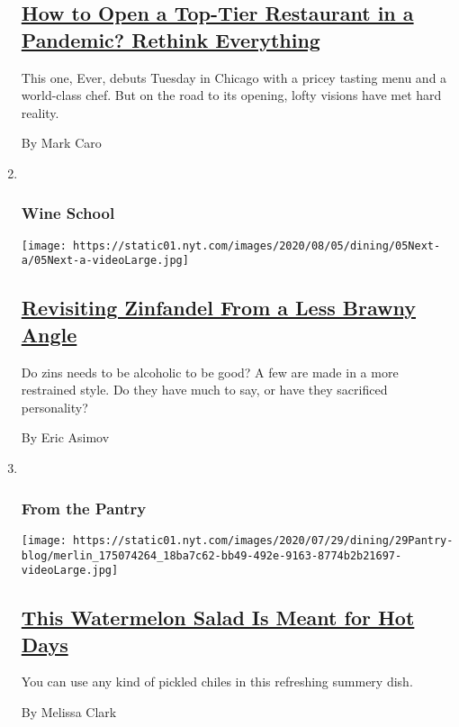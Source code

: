 \begin{enumerate}
  \hypertarget{how-to-open-a-top-tier-restaurant-in-a-pandemic-rethink-everything}{%
  \subsection{\texorpdfstring{\href{/2020/07/28/dining/ever-chicago-restaurant-coronavirus.html}{How
  to Open a Top-Tier Restaurant in a Pandemic? Rethink
  Everything}}{How to Open a Top-Tier Restaurant in a Pandemic? Rethink Everything}}\label{how-to-open-a-top-tier-restaurant-in-a-pandemic-rethink-everything}}

  This one, Ever, debuts Tuesday in Chicago with a pricey tasting menu
  and a world-class chef. But on the road to its opening, lofty visions
  have met hard reality.

  By Mark Caro
\item ~
  \hypertarget{wine-school-1}{%
  \subsubsection{Wine School}\label{wine-school-1}}

  \texttt{[image: https://static01.nyt.com/images/2020/08/05/dining/05Next-a/05Next-a-videoLarge.jpg]}

  \hypertarget{revisiting-zinfandel-from-a-less-brawny-angle}{%
  \subsection{\texorpdfstring{\href{/2020/07/30/dining/drinks/wine-school-assignment-zinfandel.html}{Revisiting
  Zinfandel From a Less Brawny
  Angle}}{Revisiting Zinfandel From a Less Brawny Angle}}\label{revisiting-zinfandel-from-a-less-brawny-angle}}

  Do zins needs to be alcoholic to be good? A few are made in a more
  restrained style. Do they have much to say, or have they sacrificed
  personality?

  By Eric Asimov
\item ~
  \hypertarget{from-the-pantry}{%
  \subsubsection{From the Pantry}\label{from-the-pantry}}

  \texttt{[image: https://static01.nyt.com/images/2020/07/29/dining/29Pantry-blog/merlin\_175074264\_18ba7c62-bb49-492e-9163-8774b2b21697-videoLarge.jpg]}

  \hypertarget{this-watermelon-salad-is-meant-for-hot-days}{%
  \subsection{\texorpdfstring{\href{/2020/07/29/dining/watermelon-salad-recipe.html}{This
  Watermelon Salad Is Meant for Hot
  Days}}{This Watermelon Salad Is Meant for Hot Days}}\label{this-watermelon-salad-is-meant-for-hot-days}}

  You can use any kind of pickled chiles in this refreshing summery
  dish.

  By Melissa Clark
\end{enumerate}

